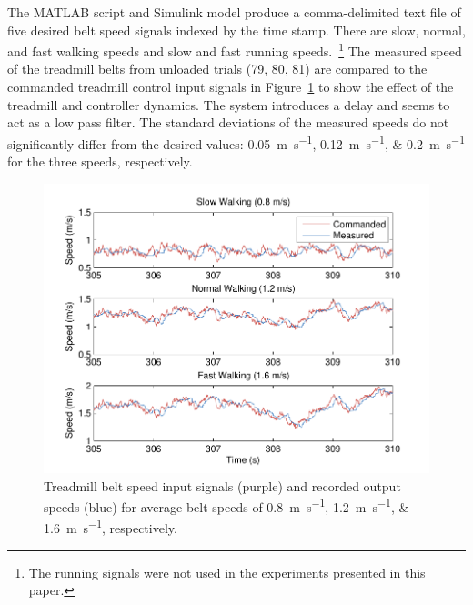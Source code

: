\documentclass[fleqn,12pt]{wlpeerj}
\begin{document}
The MATLAB script and Simulink model produce a comma-delimited text file of
five desired belt speed signals indexed by the time stamp. There are slow, normal,
and fast walking speeds and slow and fast running speeds.~\footnote{The running
signals were not used in the experiments presented in this paper.} The measured
speed of the treadmill belts from unloaded trials (79, 80, 81) are compared to
the commanded treadmill control input signals in
Figure~\ref{fig:input_output} to show the effect of the treadmill and
controller dynamics. The system introduces a delay and seems to act as a low
pass filter. The standard deviations of the measured speeds do not
significantly differ from the desired values:
\SIlist{0.05;0.12;0.2}{\meter\per\second} for the three speeds, respectively.
%
\begin{figure}
  \centering
  \includegraphics{figures/input_vs_output.pdf}
  \caption{Treadmill belt speed input signals (purple) and recorded output
    speeds (blue) for average belt speeds of
    \SIlist{0.8;1.2;1.6}{\meter\per\second}, respectively.}
  \label{fig:input_output}
\end{figure}
\end{document}
